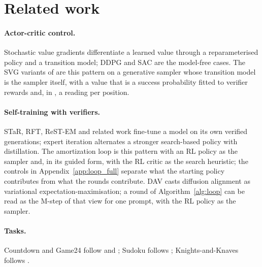 \section{Related work}
\label{app:related}
\paragraph{Actor-critic control.}
Stochastic value gradients \citep{heess2015svg} differentiate a learned value through a reparameterised policy and a transition model; DDPG and SAC \citep{lillicrap2015ddpg,haarnoja2018sac} are the model-free cases. The SVG variants of \method{} are this pattern on a generative sampler whose transition model is the sampler itself, with a value that is a success probability fitted to verifier rewards and, in \methodSVGTwoD{}, a reading per position.

\paragraph{Self-training with verifiers.}
STaR, RFT, ReST-EM and related work \citep{zelikman2022star,yuan2023rft,singh2023restem,huang2022selfimprove} fine-tune a model on its own verified generations; expert iteration \citep{anthony2017exit} alternates a stronger search-based policy with distillation. The amortization loop is this pattern with an RL policy as the sampler and, in its guided form, with the RL critic as the search heuristic; the controls in Appendix~\ref{app:loop_full} separate what the starting policy contributes from what the rounds contribute. DAV \citep{lee2026dav} casts diffusion alignment as variational expectation-maximisation; a round of Algorithm~\ref{alg:loop} can be read as the M-step of that view for one prompt, with the RL policy as the sampler.

\paragraph{Tasks.}
Countdown and Game24 follow \citet{gandhi2024sos} and \citet{yao2023tot}; Sudoku follows \citet{shah2024sudoku}; Knights-and-Knaves follows \citet{xie2024kk}.
